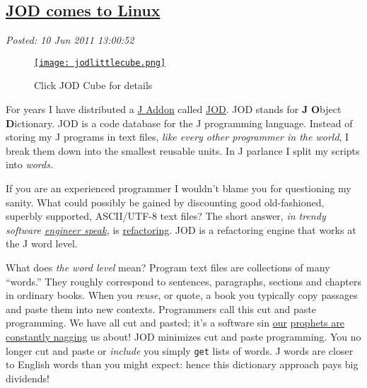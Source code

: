 %

\subsection*{\href{https://bakerjd99.wordpress.com/2011/06/10/jod-comes-to-linux/}{JOD comes to Linux}}


\noindent\emph{Posted: 10 Jun 2011 13:00:52}
\vspace{6pt}

\captionsetup[figure]{labelformat=empty}
\begin{figure}[htbp]
\centering
\href{https://analyzethedatanotthedrivel.org/the-jod-page/}{\texttt{[image: jodlittlecube.png]}}
\caption{Click JOD Cube for details}
\label{fig:jodlittlecube}
\end{figure}

For years I have distributed a
\href{http://www.jsoftware.com/jwiki/Addons}{J Addon} called
\href{http://bakerjd99.wordpress.com/the-jod-page/}{JOD}. JOD stands for
\textbf{J} \textbf{O}bject \textbf{D}ictionary. JOD is a code database
for the J programming language. Instead of storing my J programs in text
files, \emph{like every other programmer in the world}, I break them
down into the smallest reusable units. In J parlance I split my scripts
into \emph{words.}

If you are an experienced programmer I wouldn't blame you for
questioning my sanity. What could possibly be gained by discounting good
old-fashioned, superbly supported, ASCII/UTF-8 text files? The short
answer, \emph{in trendy software
\href{http://ee.cleversoul.com/fun/engspeak.html}{engineer speak},} is
\href{http://c2.com/cgi/wiki?WhatIsRefactoring}{refactoring}. JOD is a
refactoring engine that works at the J word level.

What does \emph{the word level} mean? Program text files are collections
of many ``words.'' They roughly correspond to sentences, paragraphs,
sections and chapters in ordinary books. When you \emph{reuse}, or
quote, a book you typically copy passages and paste them into new
contexts. Programmers call this cut and paste programming. We have all
cut and pasted; it's a software sin
\href{http://c2.com/cgi/wiki?CopyAndPasteProgramming}{our} \href{http://c2.com/cgi/wiki?CopyAndPasteProgramming}{prophets
are constantly nagging} us about! JOD minimizes cut and paste
programming. You no longer cut and paste or \emph{include} you simply
\texttt{get}
lists of words. J words are closer to English words than you might
expect: hence this dictionary approach pays big dividends!

